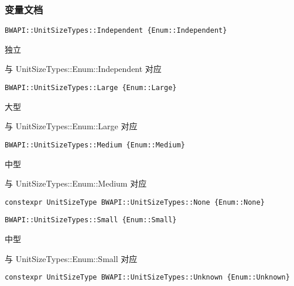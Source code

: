 \subsubsection{变量文档}
\begin{tcolorbox}[colback=white, colframe=black!60!white, title=Independent(), arc=0mm]
\begin{verbatim}
BWAPI::UnitSizeTypes::Independent {Enum::Independent}
\end{verbatim}
独立 \par
与   UnitSizeTypes::Enum::Independent   对应
\end{tcolorbox}

\begin{tcolorbox}[colback=white, colframe=black!60!white, title=Large(), arc=0mm]
\begin{verbatim}
BWAPI::UnitSizeTypes::Large {Enum::Large}
\end{verbatim}
大型 \par
与   UnitSizeTypes::Enum::Large   对应
\end{tcolorbox}

\begin{tcolorbox}[colback=white, colframe=black!60!white, title=Medium(), arc=0mm]
\begin{verbatim}
BWAPI::UnitSizeTypes::Medium {Enum::Medium}
\end{verbatim}
中型 \par
与   UnitSizeTypes::Enum::Medium   对应
\end{tcolorbox}

\begin{tcolorbox}[colback=white, colframe=black!60!white, title=None(), arc=0mm]
\begin{verbatim}
constexpr UnitSizeType BWAPI::UnitSizeTypes::None {Enum::None}
\end{verbatim}
\end{tcolorbox}

\begin{tcolorbox}[colback=white, colframe=black!60!white, title=Small(), arc=0mm]
\begin{verbatim}
BWAPI::UnitSizeTypes::Small {Enum::Small}
\end{verbatim}
中型 \par
与   UnitSizeTypes::Enum::Small   对应
\end{tcolorbox}

\begin{tcolorbox}[colback=white, colframe=black!60!white, title=Unknown(), arc=0mm]
\begin{verbatim}
constexpr UnitSizeType BWAPI::UnitSizeTypes::Unknown {Enum::Unknown}
\end{verbatim}
\end{tcolorbox}